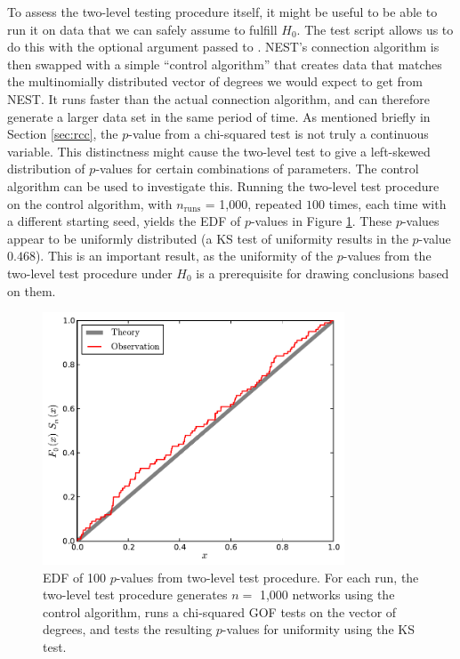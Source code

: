 To assess the two-level testing procedure itself, it might be useful to be able to run it on data that we can safely assume to fulfill $H_0$. The test script allows us to do this with the optional argument  passed to . NEST's connection algorithm is then swapped with a simple ``control algorithm'' that creates data that matches the multinomially distributed vector of degrees we would expect to get from NEST. It runs faster than the actual connection algorithm, and can therefore generate a larger data set in the same period of time. As mentioned briefly in Section \ref{sec:rcc}, the $p$-value from a chi-squared test is not truly a continuous variable. This distinctness might cause the two-level test to give a left-skewed distribution of $p$-values for certain combinations of parameters. The control algorithm can be used to investigate this. Running the two-level test procedure on the control algorithm, with $n_\text{runs}$ = 1,000, repeated $100$ times, each time with a different starting seed, yields the EDF of $p$-values in Figure \ref{fig:RCC_control_EDF}. These $p$-values appear to be uniformly distributed (a KS test of uniformity results in the $p$-value $0.468$). This is an important result, as the uniformity of the $p$-values from the two-level test procedure under $H_0$ is a prerequisite for drawing conclusions based on them.
\begin{figure}[h]
  \centering
  \includegraphics[width=0.8\textwidth]{RCC_control_EDF.pdf}
  \caption[EDF of 100 $p$-values from the two-level tests procedure]{EDF of 100 $p$-values from two-level test procedure. For each run, the two-level test procedure generates $n =$ 1,000 networks using the control algorithm, runs a chi-squared GOF tests on the vector of degrees, and tests the resulting $p$-values for uniformity using the KS test.}
  \label{fig:RCC_control_EDF}
\end{figure} 


